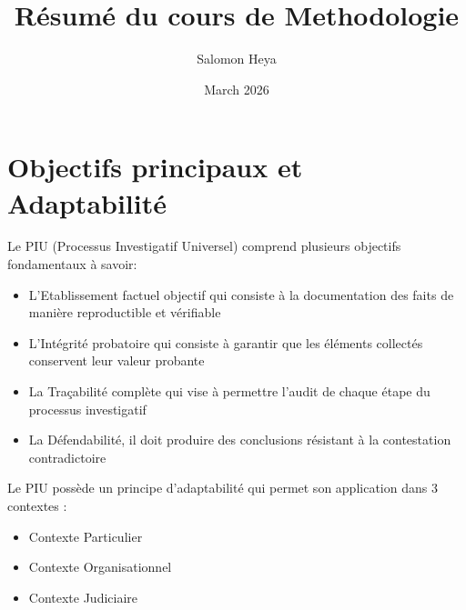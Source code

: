 \documentclass[french]{article}
\title{Résumé du cours de Methodologie}
\author{Salomon Heya}
\date{March 2026}
\begin{document}
\maketitle

\section{Objectifs principaux et Adaptabilité}

Le PIU (Processus Investigatif Universel) comprend plusieurs objectifs fondamentaux à savoir: 
\begin{itemize}
    \item L'Etablissement factuel objectif qui consiste à la documentation des faits de manière reproductible et vérifiable
    \item L'Intégrité probatoire qui consiste à garantir que les éléments collectés conservent leur valeur probante
    \item La Traçabilité complète qui vise à permettre l'audit de chaque étape du processus investigatif
    \item La Défendabilité, il doit produire des conclusions résistant à la contestation contradictoire
\end{itemize}

Le PIU possède un principe d'adaptabilité qui permet son application dans 3 contextes :
\begin{itemize}
    \item Contexte Particulier
    \item Contexte Organisationnel
    \item Contexte Judiciaire
\end{itemize}
\end{document}
